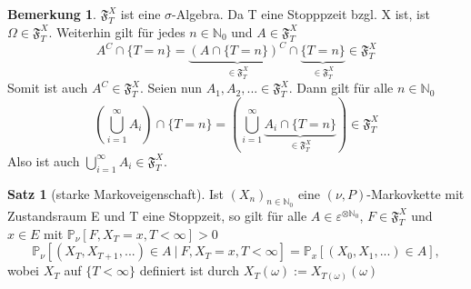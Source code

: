 \documentclass[a4paper,12pt]{scrartcl}
\theoremstyle{definition}
\newtheorem{bem}{Bemerkung}[section]
\newtheorem{sat}{Satz}[section]
\begin{document}
\begin{bem}
$\mathfrak{F}_{T}^{X}$ ist eine $\sigma$-Algebra. Da T eine Stopppzeit bzgl. X ist, ist $\Omega \in \mathfrak{F}_{T}^{X}$. Weiterhin gilt für jedes $n \in \mathbb{N}_{0}$ und $A \in \mathfrak{F}_{T}^{X}$
\begin{equation*}
A^{C} \cap \lbrace T = n \rbrace = \underbrace{(A \cap \lbrace T = n \rbrace)^{C}}_{ \in \mathfrak{F}_{T}^{X}} \cap \underbrace{\lbrace T = n \rbrace}_{ \in \mathfrak{F}_{T}^{X}} \in \mathfrak{F}_{T}^{X}
\end{equation*}
Somit ist auch $A^{C} \in \mathfrak{F}_{T}^{X}$. Seien nun $A_{1},A_{2},... \in \mathfrak{F}_{T}^{X}$. Dann gilt für alle $n \in \mathbb{N}_{0}$
\begin{equation*}
(\bigcup_{i=1}^{\infty} A_{i}) \cap \lbrace T = n \rbrace = (\bigcup_{i=1}^{\infty} \underbrace { A_{i} \cap \lbrace T = n \rbrace}_{ \in \mathfrak{F}_{T}^{X}}) \in \mathfrak{F}_{T}^{X}
\end{equation*}
Also ist auch $\bigcup_{i=1}^{\infty} A_{i} \in \mathfrak{F}_{T}^{X}$.
\end{bem}
\begin{sat}[starke Markoveigenschaft] 
\label{starke Markoveigenschaft}
Ist $(X_{n})_{n \in \mathbb{N}_{0}}$ eine $(\nu,P)$-Markovkette mit Zustandsraum E und T eine Stoppzeit, so gilt für alle $A \in \varepsilon^{ \otimes \mathbb{N}_{0}}$, $F \in \mathfrak{F}_{T}^{X}$ und $x \in E$ mit $\mathbb{P}_{\nu}[F,X_{T} = x, T < \infty] > 0$
\begin{equation*}
\mathbb{P}_{\nu}[(X_{T},X_{T+1},...) \in A \: | \: F, X_{T} = x, T < \infty] = \mathbb{P}_{x}[(X_{0},X_{1},...) \in A],
\end{equation*}
wobei $X_{T}$ auf $\lbrace T < \infty \rbrace$ definiert ist durch $X_{T}(\omega) := X_{T(\omega)}(\omega)$
\end{sat}
\end{document}

